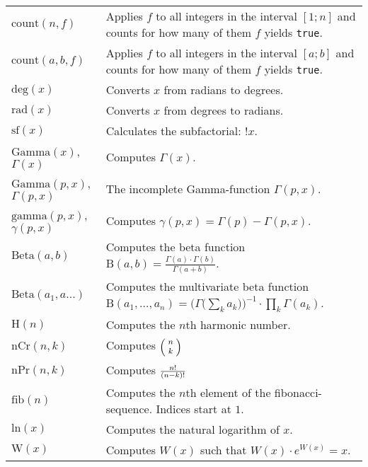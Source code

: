\documentclass[10pt]{article}
\newcommand{\tabgap}{\vspace{3mm}\\}
\begin{document}
\begin{longtable}{p{}p{}}
        $ \mathrm{count}(n, f) $                   & Applies $ f $ to all integers in the interval $ [1;n] $ and counts for how many of them $ f $ yields \verb|true|. \\
        $ \mathrm{count}(a, b, f) $                & Applies $ f $ to all integers in the interval $ [a;b] $ and counts for how many of them $ f $ yields \verb|true|. \tabgap
        $ \mathrm{deg}(x) $                        & Converts $ x $ from radians to degrees. \\
        $ \mathrm{rad}(x) $                        & Converts $ x $ from degrees to radians. \tabgap
        $ \mathrm{sf}(x) $                         & Calculates the subfactorial: $ !x $. \\
        $ \mathrm{Gamma}(x) $, $ \Gamma(x) $       & Computes $ \Gamma(x) $. \\
        $ \mathrm{Gamma}(p, x) $, $ \Gamma(p, x) $ & The incomplete Gamma-function $ \Gamma(p, x) $. \\
        $ \mathrm{gamma}(p, x) $, $ \gamma(p, x) $ & Computes $ \gamma(p, x) = \Gamma(p) - \Gamma(p, x) $. \\
        $ \mathrm{Beta}(a, b) $                    & Computes the beta function $ \mathrm{B}(a, b) = \frac{\Gamma(a) \cdot \Gamma(b)}{\Gamma(a + b)} $. \\
        $ \mathrm{Beta}(a_1, a...) $               & Computes the multivariate beta function $ \mathrm{B}(a_1, \dots, a_n) = \Big(\Gamma\big(\sum_k a_k\big)\Big)^{-1} \cdot \prod_k \Gamma(a_k) $. \\
        $ \mathrm{H}(n) $                          & Computes the $ n $th harmonic number. \tabgap
        $ \mathrm{nCr}(n, k) $                     & Computes $ \footnotesize\Bigl(\kern-2\nulldelimiterspace\begin{array}{c}n\\k\end{array}\kern-2\nulldelimiterspace\Bigr) $ \\
        $ \mathrm{nPr}(n, k) $                     & Computes $ \footnotesize\frac{n!}{(n-k)!} $ \\
        $ \mathrm{fib}(n) $                        & Computes the $ n $th element of the fibonacci-sequence. Indices start at $ 1 $. \\
        $ \mathrm{ln}(x) $                         & Computes the natural logarithm of $ x $. \\
        $ \mathrm{W}(x) $                          & Computes $ W(x) $ such that $ W(x) \cdot e^{W(x)} = x $. \\

\end{longtable}
\end{document}
